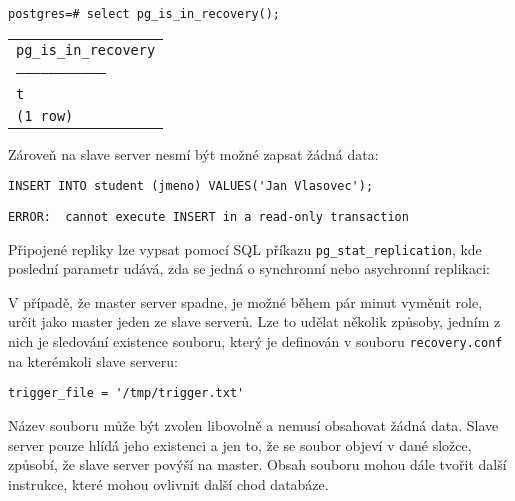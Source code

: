 \begin{lstlisting}
postgres=# select pg_is_in_recovery();
\end{lstlisting}
    \begin{table}[H]
        \begin{center}
      \label{pgHba}
          \begin{tabular}{l}
            \texttt{pg\_is\_in\_recovery}\\
            \texttt{---------------------------------}\\
            \texttt{t}\\
            \texttt{(1 row)}\\
          \end{tabular}
        \end{center}
    \end{table}

Zároveň na slave server nesmí být možné zapsat žádná data:

\begin{lstlisting}
INSERT INTO student (jmeno) VALUES('Jan Vlasovec');
\end{lstlisting}
\begin{lstlisting}[keywordstyle=\color{black},identifierstyle=\color{black},stringstyle=\color{black}]
ERROR:  cannot execute INSERT in a read-only transaction
\end{lstlisting}

Připojené repliky lze vypsat pomocí SQL příkazu \texttt{pg\_stat\_replication}, kde poslední parametr udává, zda se jedná o synchronní nebo asychronní replikaci:



V případě, že master server spadne, je možné během pár minut vyměnit role, určit jako master jeden ze slave serverů. Lze to udělat několik způsoby, jedním z nich je sledování existence souboru, který je definován v souboru \texttt{recovery.conf} na kterémkoli slave serveru:

\begin{lstlisting}
trigger_file = '/tmp/trigger.txt'
\end{lstlisting}

Název souboru může být zvolen libovolně a nemusí obsahovat žádná data. Slave server pouze hlídá jeho existenci a jen to, že se soubor objeví v dané složce, způsobí, že slave server povýší na master. Obsah souboru mohou dále tvořit další instrukce, které mohou ovlivnit další chod databáze. 

